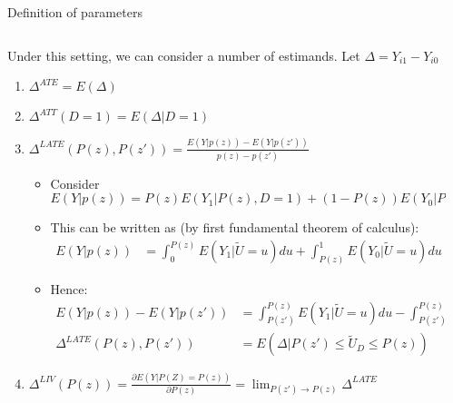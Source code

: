 \documentclass[notes,11pt, aspectratio=169]{beamer}
\newenvironment{wideitemize}{\itemize\addtolength{\itemsep}{10pt}}{\enditemize}
\begin{document}
\begin{frame}{Definition of parameters}
  \begin{columns}[T] %
    \begin{column}{0.95\textwidth}
      \begin{wideitemize}
      \item Under this setting, we can consider a number of estimands. Let $\Delta = Y_{i1} - Y_{i0}$
        \begin{enumerate}
        \item $\Delta^{ATE} = E(\Delta)$
        \item $\Delta^{ATT}(D = 1) = E(\Delta | D = 1)$
        \item $\Delta^{LATE}(P(z), P(z')) = \frac{E(Y| p(z)) - E(Y| p(z'))}{p(z) - p(z')}$
          \begin{itemize}
          \item Consider $E(Y | p(z)) = P(z) E(Y_{1} | P(z), D = 1) + (1-  P(z)) E(Y_{0} | P(z), D = 0)$
          \item This can be written as (by first fundamental theorem of calculus):
            \begin{align*}
              E(Y | p(z)) &= \int_{0}^{P(z)}E(Y_{1} | \widetilde{U} = u) du + \int_{P(z)}^{1}E(Y_{0} | \widetilde{U} = u) du
            \end{align*}
          \item Hence:
            \begin{align*}
              E(Y | p(z)) - E(Y | p(z'))  &= \int_{P(z')}^{P(z)}E(Y_{1} | \widetilde{U} = u) du -  \int_{P(z')}^{P(z)}E(Y_{0} | \widetilde{U} = u) du\\
              \Delta^{LATE}(P(z), P(z')) &= E(\Delta | P(z') \leq \widetilde{U}_{D} \leq P(z))
            \end{align*}

          \end{itemize}
        \item $\Delta^{LIV}(P(z)) = \frac{\partial E(Y | P(Z) = P(z))}{\partial P(z)} = \lim_{P(z') \rightarrow P(z)} \Delta^{LATE}$
        \end{enumerate}
      \end{wideitemize}
\end{column}
\begin{column}{0.4\textwidth}
\end{column}
\end{columns}
\end{frame}
\end{document}
